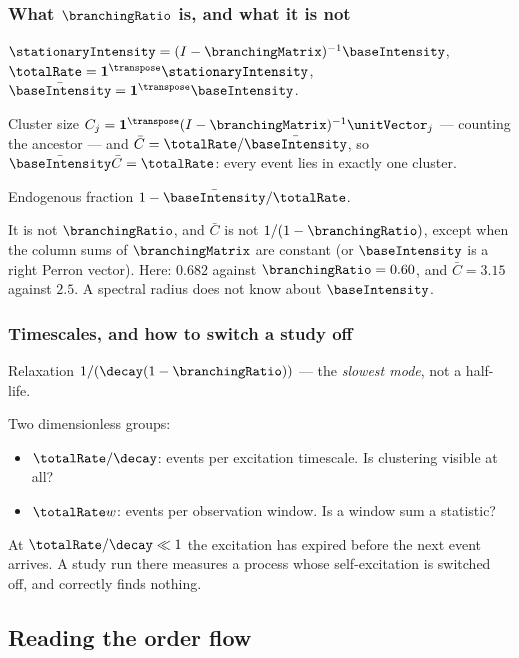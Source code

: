 \begin{frame}
  \frametitle{What $\branchingRatio$ is, and what it is not}
$\stationaryIntensity = (I-\branchingMatrix)^{-1}\baseIntensity$,
$\totalRate = \mathbf{1}^{\transpose}\stationaryIntensity$,
$\bar{\baseIntensity} = \mathbf{1}^{\transpose}\baseIntensity$.

Cluster size $C_j = \mathbf{1}^{\transpose}(I-\branchingMatrix)^{-1}\unitVector_j$
--- \alert{counting the ancestor} --- and
$\bar{C} = \totalRate/\bar{\baseIntensity}$, so $\bar{\baseIntensity}\bar{C} = \totalRate$:
every event lies in exactly one cluster.

Endogenous fraction $1 - \bar{\baseIntensity}/\totalRate$.

\alert{It is not $\branchingRatio$}, and $\bar C$ is not $1/(1-\branchingRatio)$,
except when the column sums of $\branchingMatrix$ are constant
(or $\baseIntensity$ is a right Perron vector).
Here: $0.682$ against $\branchingRatio = 0.60$, and $\bar C = 3.15$ against $2.5$.
A spectral radius does not know about $\baseIntensity$.
\end{frame}

\begin{frame}
  \frametitle{Timescales, and how to switch a study off}
Relaxation $1/(\decay(1-\branchingRatio))$ --- the \emph{slowest mode}, not a half-life.

Two dimensionless groups:
\begin{itemize}
 \item $\totalRate/\decay$: events per excitation timescale. Is clustering visible at all?
 \item $\totalRate w$: events per observation window. Is a window sum a statistic?
\end{itemize}

At $\totalRate/\decay \ll 1$ the excitation has expired before the next event arrives.
A study run there measures a process whose self-excitation is switched off,
and correctly finds nothing.
\end{frame}

\subsection{Reading the order flow}

